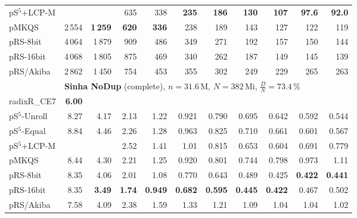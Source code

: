 \documentclass[a4paper]{myjournal}
\begin{document}
\begin{table}
\begin{tabular}{l|*{10}{r}|@{}}
 pS$^5$+LCP-M &        &            &     635 &     338 & \bf 235 & \bf 186 & \bf 130 & \bf 107 & \bf 97.6 & \bf 92.0 \\
        pMKQS & 2\,554 & \bf 1\,259 & \bf 620 & \bf 336 &     238 &     189 &     143 &     127 &      122 &      119 \\
     pRS-8bit & 4\,064 &     1\,879 &     909 &     486 &     349 &     271 &     192 &     157 &      150 &      144 \\
    pRS-16bit & 4\,068 &     1\,805 &     875 &     469 &     340 &     262 &     187 &     149 &      145 &      139 \\
    pRS/Akiba & 2\,862 &     1\,450 &     754 &     453 &     355 &     302 &     249 &     229 &      265 &      263 \\ \hline
& \multicolumn{10}{l|}{\textbf{Sinha NoDup} (complete), $n = 31.6\,\text{M}$, $N = 382\,\text{Mi}$, $\frac{D}{N} = 73.4\,\%$} \\ \cline{2-11}
radixR\_CE7 & \bf 6.00 &  &  &  &  &  &  &  &  &  \\
pS$^5$-Unroll & 8.27 &     4.17 &     2.13 &      1.22 &     0.921 &     0.790 &     0.695 &     0.642 &     0.592 &     0.544 \\
 pS$^5$-Equal & 8.84 &     4.46 &     2.26 &      1.28 &     0.963 &     0.825 &     0.710 &     0.661 &     0.601 &     0.567 \\
 pS$^5$+LCP-M &      &          &     2.52 &      1.41 &      1.01 &     0.815 &     0.653 &     0.604 &     0.691 &     0.779 \\
        pMKQS & 8.44 &     4.30 &     2.21 &      1.25 &     0.920 &     0.801 &     0.744 &     0.798 &     0.973 &      1.11 \\
     pRS-8bit & 8.35 &     4.06 &     2.01 &      1.08 &     0.770 &     0.643 &     0.489 &     0.425 & \bf 0.422 & \bf 0.441 \\
    pRS-16bit & 8.35 & \bf 3.49 & \bf 1.74 & \bf 0.949 & \bf 0.682 & \bf 0.595 & \bf 0.445 & \bf 0.422 &     0.467 &     0.502 \\
    pRS/Akiba & 7.58 &     4.09 &     2.38 &      1.59 &      1.33 &      1.21 &      1.09 &      1.04 &      1.04 &      1.02 \\ \hline
\end{tabular}
\end{table}
\end{document}
